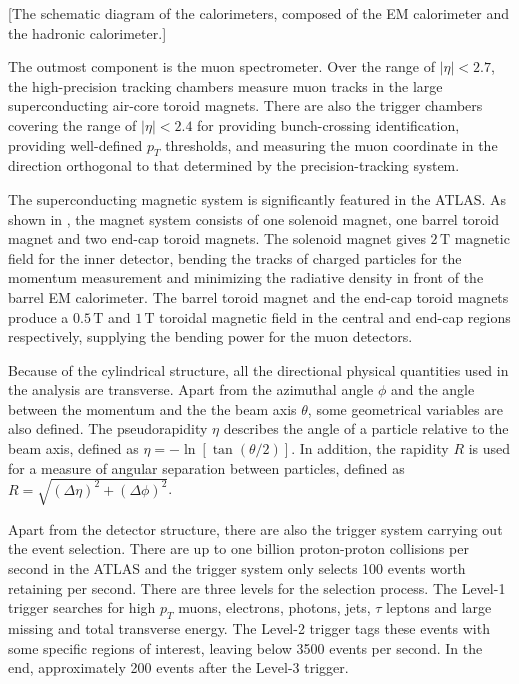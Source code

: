 \documentclass[class=NTHU_thesis, crop=false]{standalone}
\begin{document}
[The schematic diagram of the calorimeters, composed of the EM calorimeter and the hadronic calorimeter.]

The outmost component is the muon spectrometer. Over the range of $\left|\eta\right| < 2.7$, the high-precision tracking chambers measure muon tracks in the large superconducting air-core toroid magnets. There are also the trigger chambers covering the range of $\left|\eta\right| < 2.4$ for providing bunch-crossing identification, providing well-defined $p_T$ thresholds, and measuring the muon coordinate in the direction orthogonal to that determined by the precision-tracking system.

The superconducting magnetic system is significantly featured in the ATLAS. As shown in , the magnet system consists of one solenoid magnet, one barrel toroid magnet and two end-cap toroid magnets. The solenoid magnet gives $2\, \mathrm{T}$ magnetic field for the inner detector, bending the tracks of charged particles for the momentum measurement and minimizing the radiative density in front of the barrel EM calorimeter. The barrel toroid magnet and the end-cap toroid magnets produce a $0.5\, \mathrm{T}$ and $1\, \mathrm{T}$ toroidal magnetic field in the central and end-cap regions respectively, supplying the bending power for the muon detectors.

Because of the cylindrical structure, all the directional physical quantities used in the analysis are transverse. Apart from the azimuthal angle $\phi$ and the angle between the momentum and the the beam axis $\theta$, some geometrical variables are also defined. The pseudorapidity $\eta$ describes the angle of a particle relative to the beam axis, defined as $\eta = -\ln[\tan(\theta/2)]$. In addition, the rapidity $R$ is used for a measure of angular separation between particles, defined as $R = \sqrt{(\Delta\eta)^2 + (\Delta\phi)^2}$.

Apart from the detector structure, there are also the trigger system carrying out the event selection. There are up to one billion proton-proton collisions per second in the ATLAS and the trigger system only selects 100 events worth retaining per second. There are three levels for the selection process. The Level-1 trigger searches for high $p_T$ muons, electrons, photons, jets, $\tau$ leptons and large missing and total transverse energy. The Level-2 trigger tags these events with some specific regions of interest, leaving below 3500 events per second. In the end, approximately 200 events after the Level-3 trigger.
\end{document}
